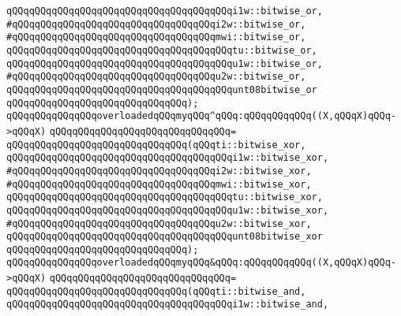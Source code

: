 \verb|qQQqqQQqqQQqqQQqqQQqqQQqqQQqqQQqqQQqqQQqi1w::bitwise_or,|\newline
\verb|#qQQqqQQqqQQqqQQqqQQqqQQqqQQqqQQqqQQqi2w::bitwise_or,|\newline
\verb|#qQQqqQQqqQQqqQQqqQQqqQQqqQQqqQQqqQQqmwi::bitwise_or,|\newline
\verb|qQQqqQQqqQQqqQQqqQQqqQQqqQQqqQQqqQQqqQQqtu::bitwise_or,|\newline
\verb|qQQqqQQqqQQqqQQqqQQqqQQqqQQqqQQqqQQqqQQqu1w::bitwise_or,|\newline
\verb|#qQQqqQQqqQQqqQQqqQQqqQQqqQQqqQQqqQQqu2w::bitwise_or,|\newline
\verb|qQQqqQQqqQQqqQQqqQQqqQQqqQQqqQQqqQQqqQQqunt08bitwise_or|\newline
\verb|qQQqqQQqqQQqqQQqqQQqqQQqqQQqqQQq);|\newline
\newline
\verb|qQQqqQQqqQQqqQQqoverloadedqQQqmyqQQq^qQQq:qQQqqQQqqQQq((X,qQQqX)qQQq->qQQqX)|\newline
\verb|qQQqqQQqqQQqqQQqqQQqqQQqqQQqqQQq=|\newline
\verb|qQQqqQQqqQQqqQQqqQQqqQQqqQQqqQQq(qQQqti::bitwise_xor,|\newline
\verb|qQQqqQQqqQQqqQQqqQQqqQQqqQQqqQQqqQQqqQQqi1w::bitwise_xor,|\newline
\verb|#qQQqqQQqqQQqqQQqqQQqqQQqqQQqqQQqqQQqi2w::bitwise_xor,|\newline
\verb|#qQQqqQQqqQQqqQQqqQQqqQQqqQQqqQQqqQQqmwi::bitwise_xor,|\newline
\verb|qQQqqQQqqQQqqQQqqQQqqQQqqQQqqQQqqQQqqQQqtu::bitwise_xor,|\newline
\verb|qQQqqQQqqQQqqQQqqQQqqQQqqQQqqQQqqQQqqQQqu1w::bitwise_xor,|\newline
\verb|#qQQqqQQqqQQqqQQqqQQqqQQqqQQqqQQqqQQqu2w::bitwise_xor,|\newline
\verb|qQQqqQQqqQQqqQQqqQQqqQQqqQQqqQQqqQQqqQQqunt08bitwise_xor|\newline
\verb|qQQqqQQqqQQqqQQqqQQqqQQqqQQqqQQq);|\newline
\newline
\verb|qQQqqQQqqQQqqQQqoverloadedqQQqmyqQQq&qQQq:qQQqqQQqqQQq((X,qQQqX)qQQq->qQQqX)|\newline
\verb|qQQqqQQqqQQqqQQqqQQqqQQqqQQqqQQq=|\newline
\verb|qQQqqQQqqQQqqQQqqQQqqQQqqQQqqQQq(qQQqti::bitwise_and,|\newline
\verb|qQQqqQQqqQQqqQQqqQQqqQQqqQQqqQQqqQQqqQQqi1w::bitwise_and,|\newline

